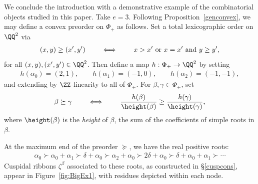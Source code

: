 \begin{exam}\label{BigEx}
We conclude the introduction with a demonstrative example of the combinatorial objects studied in this paper.
Take \(e=3\). Following Proposition~\ref{genconvex}, we may define a convex preorder on \(\Phi_+\) as follows. Set a total lexicographic order on \(\QQ^2\) via 
\begin{align*}
(x,y) \geq (x',y') \qquad \iff \qquad x>x' \textup{ or } x=x' \textup{ and }y\geq y',
\end{align*}
for all \((x,y), (x',y') \in \QQ^2\). 
Then define a map \(h: \Phi_+ \to \QQ^2\) by setting
\begin{align*}
h(\alpha_0) = (2,1),
\qquad
h(\alpha_1) = (-1,0),
\qquad
h(\alpha_2) = (-1,-1),
\end{align*}
and extending by \(\ZZ\)-linearity to all of \(\Phi_+\). For \(\beta, \gamma \in \Phi_+\), set 
\begin{align*}
\beta \succeq \gamma \qquad \iff \qquad
\frac{h(\beta)}{\height(\beta)} \geq \frac{h(\gamma)}{\height(\gamma)},
\end{align*}
where \(\height(\beta)\) is the {\em height} of \(\beta\), the sum of the coefficients of simple roots in \(\beta\).

At the maximum end of the preorder \(\succeq\), we have the real positive roots:
\begin{align*}
\alpha_0 \succ \alpha_0 + \alpha_1 \succ \delta + \alpha_0 \succ \alpha_2 + \alpha_0 \succ 2 \delta + \alpha_0 \succ \delta + \alpha_0 + \alpha_1 \succ \cdots
\end{align*}
Cuspidal ribbons \(\zeta^\beta\) associated to these roots, as constructed in \S\ref{cuspcons}, appear in Figure~\ref{fig:BigEx1}, with residues depicted within each node.


\end{exam}
